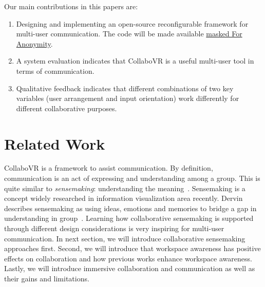 \documentclass{sigchi}
\begin{document}
Our main contributions in this papers are:
\begin{enumerate}
    \item Designing and implementing an open-source reconfigurable framework for multi-user communication. The code will be made available \url{masked For Anonymity}.
    \item A system evaluation indicates that CollaboVR is a useful multi-user tool in terms of communication.
    \item Qualitative feedback indicates that different combinations of two key variables (user arrangement and input orientation) work differently for different collaborative purposes.
\end{enumerate}


\section{Related Work}
CollaboVR is a framework to assist communication. By definition, communication is an act of expressing and understanding among a group. This is quite similar to \textit{sensemaking}: understanding the meaning~\cite{paul2009understanding}. Sensemaking is a concept widely researched in information visualization area recently. Dervin describes sensemaking as using ideas, emotions and memories to bridge a gap in understanding in group~\cite{dervin1992mind}. Learning how collaborative sensemaking is supported through different design considerations is very inspiring for multi-user communication. In next section, we will introduce collaborative sensemaking approaches first. Second, we will introduce that workspace awareness has positive effects on collaboration and how previous works enhance workspace awareness. Lastly, we will introduce immersive collaboration and communication as well as their gains and limitations.
\end{document}

